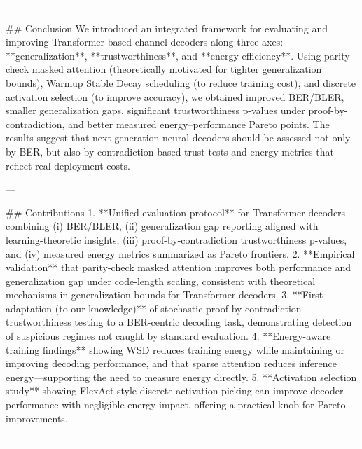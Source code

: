 ---

## Conclusion  
We introduced an integrated framework for evaluating and improving Transformer-based channel decoders along three axes: **generalization**, **trustworthiness**, and **energy efficiency**. Using parity-check masked attention (theoretically motivated for tighter generalization bounds), Warmup Stable Decay scheduling (to reduce training cost), and discrete activation selection (to improve accuracy), we obtained improved BER/BLER, smaller generalization gaps, significant trustworthiness p-values under proof-by-contradiction, and better measured energy–performance Pareto points. The results suggest that next-generation neural decoders should be assessed not only by BER, but also by contradiction-based trust tests and energy metrics that reflect real deployment costs.

---

## Contributions  
1. **Unified evaluation protocol** for Transformer decoders combining (i) BER/BLER, (ii) generalization gap reporting aligned with learning-theoretic insights, (iii) proof-by-contradiction trustworthiness p-values, and (iv) measured energy metrics summarized as Pareto frontiers.  
2. **Empirical validation** that parity-check masked attention improves both performance and generalization gap under code-length scaling, consistent with theoretical mechanisms in generalization bounds for Transformer decoders.  
3. **First adaptation (to our knowledge)** of stochastic proof-by-contradiction trustworthiness testing to a BER-centric decoding task, demonstrating detection of suspicious regimes not caught by standard evaluation.  
4. **Energy-aware training findings** showing WSD reduces training energy while maintaining or improving decoding performance, and that sparse attention reduces inference energy—supporting the need to measure energy directly.  
5. **Activation selection study** showing FlexAct-style discrete activation picking can improve decoder performance with negligible energy impact, offering a practical knob for Pareto improvements.

---